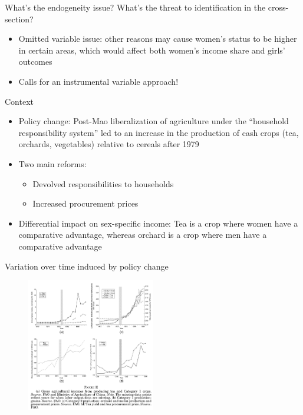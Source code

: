 \documentclass[11pt,notes=hide,aspectratio=169,mathserif]{beamer}
\begin{document}
\begin{frame}{What's the endogeneity issue?}
What's the threat to identification in the cross-section?
\begin{itemize}
\pause \item Omitted variable issue: other reasons may cause women's status to be higher in certain areas, which would affect both women's income share and girls' outcomes
\pause \item Calls for an instrumental variable approach!
\end{itemize}
\end{frame}

\begin{frame}{Context}
\begin{itemize}
\item Policy change: Post-Mao liberalization of agriculture under the “household responsibility system” led to an increase in the production of cash crops (tea, orchards, vegetables) relative to cereals after 1979
\pause \item Two main reforms:
\begin{itemize}
    \pause \item Devolved responsibilities to households
    \pause \item Increased procurement prices
\end{itemize}
\pause \item Differential impact on sex-specific income: Tea is a crop where women have a comparative advantage, whereas orchard is a crop where men have a comparative advantage
\end{itemize}
\end{frame}

\begin{frame}{Variation over time induced by policy change}
\begin{figure}
\centering
\includegraphics[width=0.5\textwidth]{inputs/fig2.png}
\end{figure}
\end{frame}
\end{document}
